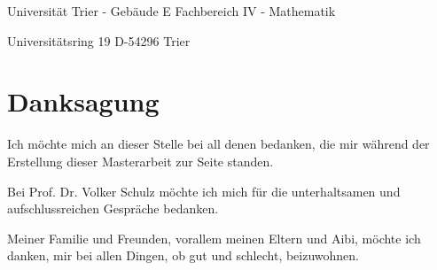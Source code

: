 \documentclass[bibliography=totoc,12pt,a4paper]{scrartcl}
\theoremstyle{exampstyle}
\numberwithin{equation}{section}
\begin{document}
\vspace{10cm}
Universität Trier - Gebäude E \newline
Fachbereich IV - Mathematik

Universitätsring 19 \newline
D-54296 Trier

\newpage




\section*{Danksagung}

Ich möchte mich an dieser Stelle bei all denen bedanken, die mir während der Erstellung dieser Masterarbeit zur Seite standen. 
\newline

Bei Prof. Dr. Volker Schulz möchte ich mich für die unterhaltsamen und aufschlussreichen Gespräche bedanken. 
\newline 

Meiner Familie und Freunden, vorallem meinen Eltern und Aibi, möchte ich danken, mir bei allen Dingen, ob gut und schlecht, beizuwohnen. 

\newpage

  \tableofcontents

\newpage

  \pagestyle{headings}
  
\end{document}
